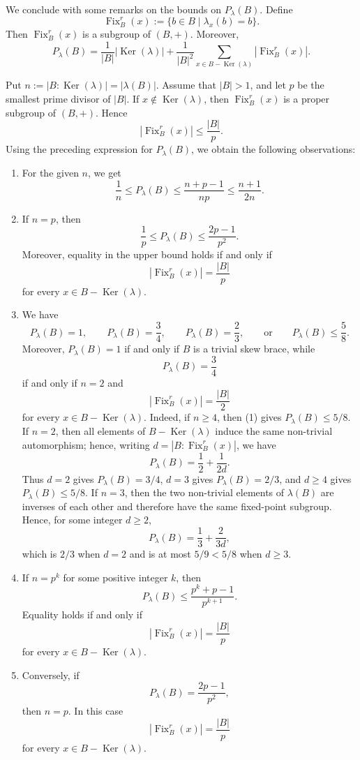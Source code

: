 \documentclass[11pt, oneside]{amsart}
\numberwithin{equation}{section}
\theoremstyle{plain}
\theoremstyle{definition}
\newcommand{\Ker}{\operatorname{Ker} }
\newcommand{\Fix}{\operatorname{Fix} }
\begin{document}
We conclude with some remarks on the bounds on $P_{\lambda}(B)$. Define
$$
\Fix^r_B(x):=\{b\in B\mid \lambda_x(b)=b\}.
$$
Then $\Fix^r_B(x)$ is a subgroup of $(B,+)$. Moreover,
$$
P_{\lambda}(B)
=
\frac{1}{|B|}|\Ker(\lambda)|
+
\frac{1}{|B|^2}
\sum_{x\in B-\Ker(\lambda)}|\Fix^r_B(x)|.
$$

Put
$n:=|B:\Ker(\lambda)|=|\lambda(B)|$. Assume that $|B|>1$, and let $p$ be the smallest prime divisor of $|B|$.
If $x\notin\Ker(\lambda)$, then $\Fix^r_B(x)$ is a proper subgroup of
$(B,+)$. Hence
$$
|\Fix^r_B(x)|\leqslant\frac{|B|}{p}.
$$
Using the preceding expression for $P_{\lambda}(B)$, we obtain the
following observations:
\begin{enumerate}
    \item For the given $n$, we get
    $$
    \frac{1}{n}
    \leqslant
    P_{\lambda}(B)
    \leqslant
    \frac{n+p-1}{np}
    \leqslant
    \frac{n+1}{2n}.
    $$

    \item
    If $n=p$, then
    $$
    \frac{1}{p}
    \leqslant
    P_{\lambda}(B)
    \leqslant
    \frac{2p-1}{p^2}.
    $$
    Moreover, equality in the upper bound holds if and only if
    $$
    |\Fix^r_B(x)|=\frac{|B|}{p}
    $$
    for every $x\in B-\Ker(\lambda)$.

\item
    We have
    $$
    P_{\lambda}(B)=1,\qquad
    P_{\lambda}(B)=\frac{3}{4},\qquad
    P_{\lambda}(B)=\frac{2}{3},
    \qquad\text{or}\qquad
    P_{\lambda}(B)\leqslant\frac{5}{8}.
    $$
    Moreover, $P_{\lambda}(B)=1$ if and only if $B$ is a trivial skew brace,
    while
    $$
    P_{\lambda}(B)=\frac{3}{4}
    $$
    if and only if $n=2$ and
    $$
    |\Fix^r_B(x)|=\frac{|B|}{2}
    $$
    for every $x\in B-\Ker(\lambda)$. Indeed, if $n\geqslant4$, then (1) gives
    $P_{\lambda}(B)\leqslant5/8$. If $n=2$, then all elements of
    $B-\Ker(\lambda)$ induce the same non-trivial automorphism; hence, writing
    $d=|B:\Fix^r_B(x)|$, we have
    $$
    P_{\lambda}(B)=\frac12+\frac{1}{2d}.
    $$
    Thus $d=2$ gives $P_{\lambda}(B) = 3/4$, $d=3$ gives $P_{\lambda}(B) = 2/3$, and $d\geqslant4$ gives
    $P_{\lambda}(B) \leqslant 5/8$. If $n=3$, then the two non-trivial elements of $\lambda(B)$ are inverses of each other
    and therefore have the same fixed-point subgroup. Hence, for some integer
    $d \geqslant 2$,
    $$
    P_{\lambda}(B)=\frac13+\frac{2}{3d},
    $$
    which is $2/3$ when $d=2$ and is at most $5/9<5/8$ when $d\geqslant3$.

    \item
    If $n=p^k$ for some positive integer $k$, then
    $$
    P_{\lambda}(B)
    \leqslant
    \frac{p^k+p-1}{p^{k+1}}.
    $$
    Equality holds if and only if
    $$
    |\Fix^r_B(x)|=\frac{|B|}{p}
    $$
    for every $x\in B-\Ker(\lambda)$.

    \item Conversely,    if
    $$
    P_{\lambda}(B)=\frac{2p-1}{p^2},
    $$
    then $n=p$. In this case
    $$
    |\Fix^r_B(x)|=\frac{|B|}{p}
    $$
    for every $x\in B-\Ker(\lambda)$.
\end{enumerate}
\end{document}
